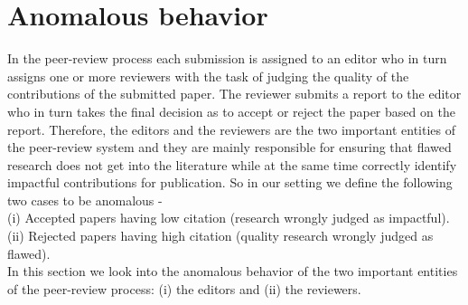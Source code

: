 \noindent
\section{Anomalous behavior}
\label{anomalies}
In the peer-review process each submission is assigned to an editor who in turn assigns one or more reviewers with the task of judging the quality of the contributions of the submitted paper. The reviewer submits a report to the editor who in turn takes the final decision as to accept or reject the paper based on the report. Therefore, the editors and the reviewers are the two important entities of the peer-review system and they are mainly responsible for ensuring that flawed research does not get into the literature while at the same time correctly identify impactful contributions for publication.  
 So in our setting we define the following two cases to be anomalous - \\
(i) Accepted papers having low citation (research wrongly judged as impactful). \\
(ii) Rejected papers having high citation (quality research wrongly judged as flawed). \\
In this section we look into the anomalous behavior of the two important entities of the peer-review process: (i) the editors and (ii) the reviewers.